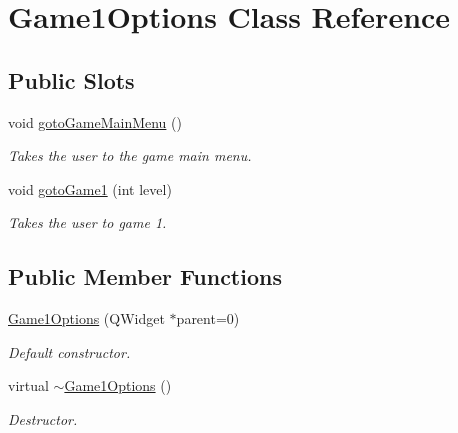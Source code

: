 \hypertarget{classGame1Options}{\section{\-Game1\-Options \-Class \-Reference}
\label{classGame1Options}
}
\subsection*{\-Public \-Slots}
\begin{DoxyCompactItemize}
\item 
void \hyperlink{classGame1Options_a3222e0a22e8ed7deb0ae7ba05677bf8d}{goto\-Game\-Main\-Menu} ()
\begin{DoxyCompactList}\small\item\em \-Takes the user to the game main menu. \end{DoxyCompactList}\item 
void \hyperlink{classGame1Options_a24872ff9bd747ce5fa184cd876d1073a}{goto\-Game1} (int level)
\begin{DoxyCompactList}\small\item\em \-Takes the user to game 1. \end{DoxyCompactList}\end{DoxyCompactItemize}
\subsection*{\-Public \-Member \-Functions}
\begin{DoxyCompactItemize}
\item 
\hyperlink{classGame1Options_a368eef646eb49bdd45a8c04e00bdc45c}{\-Game1\-Options} (\-Q\-Widget $\ast$parent=0)
\begin{DoxyCompactList}\small\item\em \-Default constructor. \end{DoxyCompactList}\item 
virtual \hyperlink{classGame1Options_ae409fa563f0e6c89e0af3786614d6265}{$\sim$\-Game1\-Options} ()
\begin{DoxyCompactList}\small\item\em \-Destructor. \end{DoxyCompactList}\end{DoxyCompactItemize}
